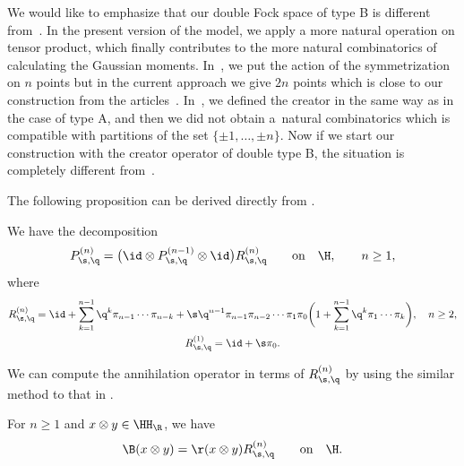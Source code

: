 \begin{Remark}
We would like to emphasize that our double Fock space of type B is different from~\cite{BozejkoEjsmontHasebe2015}.
	In the present version of the model, we apply a more natural operation on tensor product, which finally contributes to the more natural combinatorics of calculating the Gaussian moments.
	In~\cite{BozejkoEjsmontHasebe2015}, we put the action of the symmetrization on $n$ points but in the current ap\-proach we give $2n$ points which is close to our construction from the articles~\cite{BDEG2021,Ejsmont2020}. In~\cite{BozejkoEjsmontHasebe2015}, we defined the creator in the same way as in the case of type A, and then we did not obtain a~natural combinatorics which is compatible with partitions of the set $\{\pm 1,\dots, \pm n\}$.
	Now if we start our construction with the creator operator of double type B, the situation is completely different from~\cite{BozejkoEjsmontHasebe2015}.
\end{Remark}
The following proposition can be derived directly
from \cite[Proposition 2.3]{BozejkoEjsmontHasebe2015}.

\begin{Proposition}%
We have the decomposition
\begin{equation*}%
P^{(n)}_{\s,\q}=\big( \id \otimes P^{(n-1)}_{\s,\q}\otimes \id \big)R^{(n)}_{\s,\q}\qquad \text{on}\quad \H, \qquad n\geq 1,
\end{equation*}
where\vspace{-2mm}
\begin{gather*}
R^{(n)}_{\s,\q} = \id+\sum_{k=1}^{n-1}\q^{k}\pi_{n-1}\cdots \pi_{n-k} + \s \q^{n-1}\pi_{n-1} \pi_{n-2} \cdots \pi_{1}\pi_0\bigg(1+\sum_{k=1}^{n-1}\q^{k}\pi_{1}\cdots \pi_{k}\bigg), \quad n\geq 2,
\\
R^{(1)}_{\s,\q} =\id+\s\pi_0.%
\end{gather*}
\end{Proposition}

We can compute the annihilation operator in terms of $R_{\s,\q}^{(n)}$ by using the similar
method to that in \cite[Proposition~2.4]{BozejkoEjsmontHasebe2015}.

\begin{Proposition}%
For $n \geq1$ and $x\otimes y\in \HH_\R$, we have\vspace{-1mm}
\begin{equation*}
\B(x\otimes y)=\r(x\otimes y) R^{(n)}_{\s,\q}\qquad \text{on}\quad \H.
\end{equation*}
\end{Proposition}

